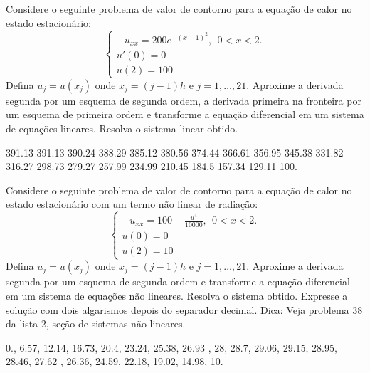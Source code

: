 \begin{exer} Considere o seguinte problema de valor de contorno para a equação de calor no estado estacionário:
$$\left\{\begin{array}{l}-u_{xx}=200e^{-(x-1)^2},~~ 0<x<2.\\
u'(0)=0\\
u(2)=100\end{array}
\right.
$$
Defina $u_j=u(x_j)$ onde $x_j={(j-1)}{h}$ e $j=1,\ldots,21$. Aproxime a derivada segunda por um esquema de segunda ordem, a derivada primeira na fronteira por um esquema de primeira ordem e transforme a equação diferencial em um sistema de equações lineares. Resolva o sistema linear obtido.
\end{exer}
\begin{resp}
391.13    391.13    390.24    388.29    385.12    380.56    374.44    366.61    356.95    345.38    331.82    316.27    298.73    279.27    257.99    234.99    210.45    184.5    157.34    129.11    100.    
\end{resp}


\begin{exer} Considere o seguinte problema de valor de contorno para a equação de calor no estado estacionário com um termo não linear de radiação:
$$\left\{\begin{array}{l}-u_{xx}=100- \frac{u^4}{10000},~~ 0<x<2.\\
u(0)=0\\
u(2)=10\end{array}
\right.
$$
Defina $u_j=u(x_j)$ onde $x_j={(j-1)}{h}$ e $j=1,\ldots,21$. Aproxime a derivada segunda por um esquema de segunda ordem e transforme a equação diferencial em um sistema de equações não lineares. Resolva o sistema  obtido. Expresse  a solução com dois algarismos depois do separador decimal. Dica: Veja problema 38 da lista 2, seção de sistemas não lineares.
\end{exer}
\begin{resp}
0.,    6.57,    12.14,    16.73,    20.4,    23.24,    25.38,    26.93 ,   28,    28.7,    29.06,    29.15,    28.95,    28.46, 27.62 ,   26.36,    24.59,    22.18,    19.02,    14.98,    10.    
\end{resp}

